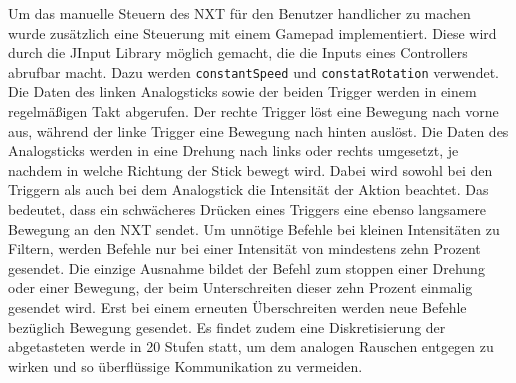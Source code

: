 \documentclass[oneside,abstractoff,a4paper]{scrartcl}
\begin{document}
Um das manuelle Steuern des NXT für den Benutzer handlicher zu machen wurde zusätzlich eine Steuerung mit einem Gamepad implementiert. Diese wird durch die JInput Library möglich gemacht, die die Inputs eines Controllers abrufbar macht.
Dazu werden \texttt{constantSpeed} und \texttt{constatRotation} verwendet. Die Daten des linken Analogsticks sowie der beiden Trigger werden in einem regelmäßigen Takt abgerufen. Der rechte Trigger löst eine Bewegung nach vorne aus, während der linke Trigger eine Bewegung nach hinten auslöst. Die Daten des Analogsticks werden in eine Drehung nach links oder rechts umgesetzt, je nachdem in welche Richtung der Stick bewegt wird. Dabei wird sowohl bei den Triggern als auch bei dem Analogstick die Intensität der Aktion beachtet. Das bedeutet, dass ein schwächeres Drücken eines Triggers eine ebenso langsamere Bewegung an den NXT sendet. Um unnötige Befehle bei kleinen Intensitäten zu Filtern, werden Befehle nur bei einer Intensität von mindestens zehn Prozent gesendet. Die einzige Ausnahme bildet der Befehl zum stoppen einer Drehung oder einer Bewegung, der beim Unterschreiten dieser zehn Prozent einmalig gesendet wird. Erst bei einem erneuten Überschreiten werden neue Befehle bezüglich Bewegung gesendet. Es findet zudem eine Diskretisierung der abgetasteten werde in 20 Stufen statt, um dem analogen Rauschen entgegen zu wirken und so überflüssige Kommunikation zu vermeiden.
\end{document}
